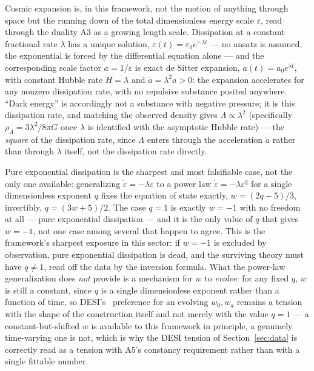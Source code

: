 \documentclass[aps,prd,twocolumn,superscriptaddress,nofootinbib]{revtex4-2}
\begin{document}
Cosmic expansion is, in this framework, not the motion of anything
through space but the running down of the total dimensionless energy
scale $\varepsilon$, read through the duality A3 as a growing length
scale. Dissipation at a constant fractional rate $\lambda$ has a unique
solution, $\varepsilon(t)=\varepsilon_0e^{-\lambda t}$ — no ansatz is
assumed, the exponential is forced by the differential equation alone —
and the corresponding scale factor $a=1/\varepsilon$ is exact de Sitter
expansion, $a(t)=a_0e^{\lambda t}$, with constant Hubble rate $H=\lambda$
and $\ddot a=\lambda^2a>0$: the expansion accelerates for any nonzero
dissipation rate, with no repulsive substance posited anywhere.
``Dark energy'' is accordingly not a substance with negative pressure;
it is this dissipation rate, and matching the observed density gives
$\Lambda \propto \lambda^2$ (specifically $\rho_\Lambda = 3\lambda^2/8\pi G$
once $\lambda$ is identified with the asymptotic Hubble rate) — the
\emph{square} of the dissipation rate, since $\Lambda$ enters through the
acceleration $\ddot a$ rather than through $\lambda$ itself, not the
dissipation rate directly.

Pure exponential dissipation is the sharpest and most falsifiable case,
not the only one available: generalizing $\dot\varepsilon=-\lambda\varepsilon$
to a power law $\dot\varepsilon=-\lambda\varepsilon^q$ for a single
dimensionless exponent $q$ fixes the equation of state exactly,
$w=(2q-5)/3$, invertibly, $q=(3w+5)/2$. The case $q=1$ is exactly
$w=-1$ with no freedom at all — pure exponential dissipation — and it is
the only value of $q$ that gives $w=-1$, not one case among several that
happen to agree. This is the framework's sharpest exposure in this
sector: if $w=-1$ is excluded by observation, pure exponential
dissipation is dead, and the surviving theory must have $q\neq1$, read
off the data by the inversion formula. What the power-law generalization
does \emph{not} provide is a mechanism for $w$ to \emph{evolve}: for any
fixed $q$, $w$ is still a constant, since $q$ is a single dimensionless
exponent rather than a function of time, so DESI's~\cite{DESIDR2}
preference for an
evolving $w_0,w_a$ remains a tension with the shape of the construction
itself and not merely with the value $q=1$ — a constant-but-shifted $w$
is available to this framework in principle, a genuinely time-varying
one is not, which is why the DESI tension of Section~\ref{sec:data} is
correctly read as a tension with A5's constancy requirement rather than
with a single fittable number.
\end{document}
